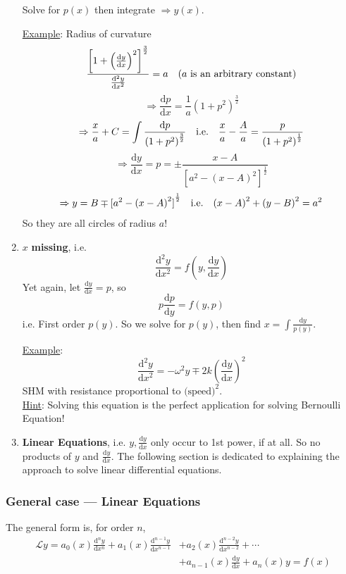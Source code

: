 \documentclass[12pt]{report}
\theoremstyle{definition}
\begin{document}
\begin{enumerate}[label = (\alph*)]
Solve for $p(x)$ then integrate $\Rightarrow y(x)$.

\underline{Example}: Radius of curvature \[
    \frac{{\left[1 + {\left(\frac{\mathrm{d}y}{\mathrm{d}x} \right)}^{2}\right]}^{\frac{3}{2}}}
    {\frac{\mathrm{d}^{2}y}{\mathrm{d}x^{2}} } = a \quad \textnormal{($a$ is an arbitrary constant)}
\]\[
\Rightarrow \frac{\mathrm{d}p}{\mathrm{d}x} = \frac{1}{a}{(1 + p^{2})}^{\frac{3}{2}}
\]\[
\Rightarrow \frac{x}{a} + C = \int \frac{\mathrm{d}p}{{(1 + p^{2})}^{\frac{3}{2}}} \quad 
\textnormal{i.e.} \quad \frac{x}{a} - \frac{A}{a} = \frac{p}{{(1 + p^{2})}^{\frac{1}{2}}}
\]\[
    \Rightarrow \frac{\mathrm{d}y}{\mathrm{d}x} = p 
    = \pm \frac{x - A}{{[a^{2} - {(x - A)}^{2}]}^{\frac{1}{2}}}
\]\[
\Rightarrow y = B \mp {[a^{2} - {(x - A)}^{2}]}^{\frac{1}{2}} \quad
\textnormal{i.e.} \quad {(x-A)}^{2} + {(y-B)}^{2} = a^{2}
\]
So they are all circles of radius $a$!

\item $x$ \textbf{missing}, i.e.\[
        \frac{\mathrm{d}^{2}y}{\mathrm{d}x^{2}} = f\left(y, \frac{\mathrm{d}y}{\mathrm{d}x} \right)
        \]Yet again, let $\frac{\mathrm{d}y}{\mathrm{d}x} = p$, so\[
p \frac{\mathrm{d}p}{\mathrm{d}y} = f(y, p)
\]
i.e. First order $p(y)$. So we solve for $p(y)$, then find $x = \int \frac{\mathrm{d}y}{p(y)}$.

\underline{Example}: \[
    \frac{\mathrm{d}^{2}y}{\mathrm{d}x^{2}} = -\omega^{2}y \mp 2k{\left(\frac{\mathrm{d}y}{\mathrm{d}x} \right)}^{2}
\]SHM with resistance proportional to $\text{(speed)}^{2}$.
\\\underline{Hint}: Solving this equation is the perfect application for solving Bernoulli Equation!

\item \textbf{Linear Equations}, i.e. $y, \frac{\mathrm{d}y}{\mathrm{d}x} $
    only occur to 1st power, if at all.
    So no products of $y$ and $\frac{\mathrm{d}y}{\mathrm{d}x} $.
    The following section is dedicated to explaining the approach to solve linear differential equations.
\end{enumerate}

\subsubsection{General case --- Linear Equations}

The general form is, for order $n$,
\begin{equation}
    \begin{align}\label{ODE:7}
    \mathscr{L} y = a_0(x)\frac{\mathrm{d}^{n}y}{\mathrm{d}x^{n}} + a_1(x)\frac{\mathrm{d}^{n-1}y}{\mathrm{d}x^{n-1}}
    & + a_2(x)\frac{\mathrm{d}^{n-2}y}{\mathrm{d}x^{n-2}} + \cdots \\
    & + a_{n-1}(x)\frac{\mathrm{d}y}{\mathrm{d}x} + a_n(x)y = f(x)
    \end{align}
\end{equation}
    
\end{document}
